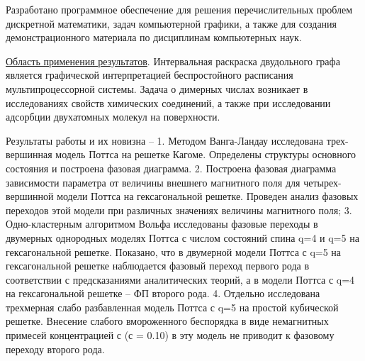 Разработано программное обеспечение для решения перечислительных проблем дискретной математики, задач компьютерной графики, а также для создания демонстрационного материала по дисциплинам компьютерных наук.

\underline{Область применения результатов}.
Интервальная раскраска двудольного графа является графической интерпретацией беспростойного расписания мультипроцессорной системы. Задача о димерных числах возникает в исследованиях свойств химических соединений, а также при исследовании адсорбции двухатомных молекул на поверхности.


Результаты работы и их новизна – 1. Методом Ванга-Ландау исследована трех-вершинная
модель Поттса на решетке Кагоме. Определены структуры основного состояния и построена
фазовая диаграмма. 2. Построена фазовая диаграмма зависимости параметра от величины внешнего
магнитного поля для четырех-вершинной модели Поттса на гексагональной решетке. Проведен
анализ фазовых переходов этой модели при различных значениях величины магнитного поля; 3.
Одно-кластерным алгоритмом Вольфа исследованы фазовые переходы в двумерных однородных
моделях Поттса с числом состояний спина q=4 и q=5 на гексагональной решетке. Показано, что в
двумерной модели Поттса с q=5 на гексагональной решетке наблюдается фазовый переход
первого рода в соответствии с предсказаниями аналитических теорий, а в модели Поттса с q=4 на
гексагональной решетке – ФП второго рода. 4. Отдельно исследована трехмерная слабо
разбавленная модель Поттса с q=5 на простой кубической решетке. Внесение слабого
вмороженного беспорядка в виде немагнитных примесей концентрацией с (с = 0.10) в эту модель
не приводит к фазовому переходу второго рода.


